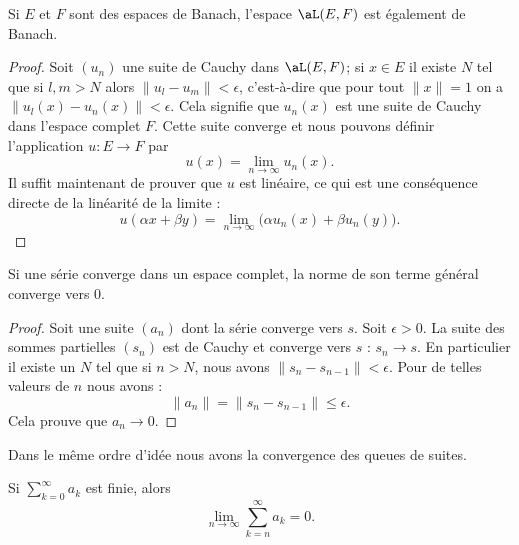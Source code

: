 \begin{lemma}       \label{LemCAIPooPMNbXg}
    Si \( E\) et \( F\) sont des espaces de Banach, l'espace \( \aL(E,F)\) est également de Banach.
\end{lemma}

\begin{proof}
    Soit \( (u_n)\) une suite de Cauchy dans \( \aL(E,F)\); si \( x\in E\) il existe \( N\) tel que si \( l,m>N\) alors \( \| u_l-u_m \|<\epsilon\), c'est-à-dire que pour tout \( \| x \|=1\) on a \( \| u_l(x)-u_n(x) \|<\epsilon\). Cela signifie que \( u_n(x)\) est une suite de Cauchy dans l'espace complet \( F\). Cette suite converge et nous pouvons définir l'application \( u\colon E\to F\) par
    \begin{equation}
        u(x)=\lim_{n\to \infty} u_n(x).
    \end{equation}
    Il suffit maintenant de prouver que \( u\) est linéaire, ce qui est une conséquence directe de la linéarité de la limite :
    \begin{equation}
        u(\alpha x+\beta y)=\lim_{n\to \infty} \big( \alpha u_n(x)+\beta u_n(y) \big).
    \end{equation}
\end{proof}

\begin{proposition}  \label{PROPooYDFUooTGnYQg}
    Si une série converge dans un espace complet, la norme de son terme général converge vers $0$.
\end{proposition}

\begin{proof}
    Soit une suite \( (a_n)\) dont la série converge vers \( s\). Soit \( \epsilon>0\). La suite des sommes partielles \( (s_n)\) est de Cauchy et converge vers \( s\) : \( s_n\to s\). En particulier il existe un \( N\) tel que si \( n>N\), nous avons \( \| s_n-s_{n-1} \|<\epsilon\). Pour de telles valeurs de \( n\) nous avons :
    \begin{equation}
        \| a_n \|=\| s_n-s_{n-1} \|\leq \epsilon.
    \end{equation}
    Cela prouve que \( a_n\to 0\).
\end{proof}

Dans le même ordre d'idée nous avons la convergence des queues de suites.

\begin{lemma}       \label{LEMooFUCOooCOqLRj}
    Si \( \sum_{k=0}^{\infty}a_k\) est finie, alors
    \begin{equation}
        \lim_{n\to \infty} \sum_{k=n}^{\infty}a_k=0.
    \end{equation}
\end{lemma}

